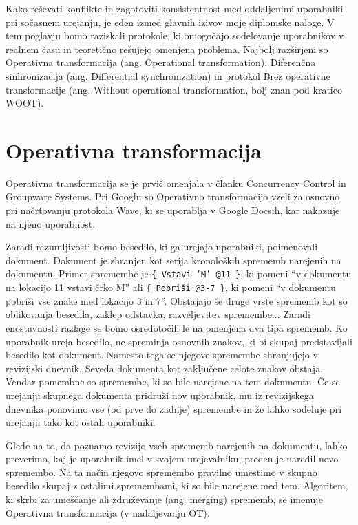 \documentclass[a4paper, 12pt, twoside]{book}
\begin{document}
Kako reševati konflikte in zagotoviti konsistentnost med oddaljenimi uporabniki pri sočasnem urejanju, je eden izmed glavnih izivov moje diplomske naloge. V tem poglavju bomo raziskali protokole, ki omogočajo sodelovanje uporabnikov v realnem času in teoretično rešujejo omenjena problema. Najbolj razširjeni so Operativna transformacija (ang. Operational transformation), Diferenčna sinhronizacija (ang. Differential synchronization) in protokol Brez operativne transformacije (ang. Without operational transformation, bolj znan pod kratico WOOT).

\section{Operativna transformacija}

Operativna transformacija se je prvič omenjala v članku Concurrency Control in Groupware Systems. Pri Googlu so Operativno transformacijo vzeli za osnovno pri načrtovanju protokola Wave, ki se uporablja v Google Docsih, kar nakazuje na njeno uporabnost.

Zaradi razumljivosti bomo besedilo, ki ga urejajo uporabniki, poimenovali dokument. Dokument je shranjen kot serija kronoloških sprememb narejenih na dokumentu. Primer spremembe je {\tt \{ Vstavi ‘M’ @11 \}}, ki pomeni “v dokumentu na lokacijo 11 vstavi črko M” ali {\tt \{ Pobriši @3-7 \}}, ki pomeni “v dokumentu pobriši vse znake med lokacijo 3 in 7”. Obstajajo še druge vrste sprememb kot so oblikovanja besedila, zaklep odstavka, razveljevitev spremembe... Zaradi enostavnosti razlage se bomo osredotočili le na omenjena dva tipa sprememb. Ko uporabnik ureja besedilo, ne spreminja osnovnih znakov, ki bi skupaj predstavljali besedilo kot dokument. Namesto tega se njegove spremembe shranjujejo v revizijski dnevnik. Seveda dokumenta kot zaključene celote znakov obstaja. Vendar pomembne so spremembe, ki so bile narejene na tem dokumentu. Če se urejanju skupnega dokumenta pridruži nov uporabnik, mu iz revizijskega dnevnika ponovimo vse (od prve do zadnje) spremembe in že lahko sodeluje pri urejanju tako kot ostali uporabniki.

Glede na to, da poznamo revizijo vseh sprememb narejenih na dokumentu, lahko preverimo, kaj je uporabnik imel v svojem urejevalniku, preden je naredil novo spremembo. Na ta način njegovo spremembo pravilno umestimo v skupno besedilo skupaj z ostalimi spremembami, ki so bile narejene med tem. Algoritem, ki skrbi za umeščanje ali združevanje (ang. merging) sprememb, se imenuje Operativna transformacija (v nadaljevanju OT).
\end{document}
